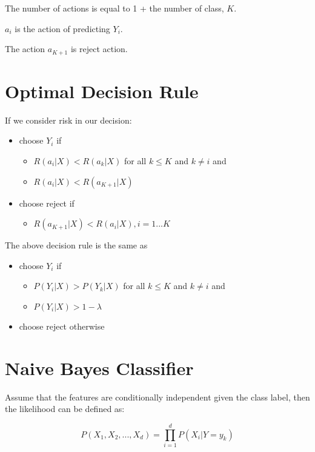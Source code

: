 \begin{multicols}{2}
\noindent The number of actions is equal to 1 + the number of class, $K$. 

\noindent $a_{i}$ is the action of predicting $Y_{i}$.

\noindent The action $a_{K+1}$ is reject action. 

\section{Optimal Decision Rule}

\noindent If we consider risk in our decision:

\begin{itemize}
    \item choose $Y_{i}$ if 
    \begin{itemize}
        \item $R(a_{i}|X) < R(a_{k}|X)$ for all $k \le K$ and $k \ne i$ and 
        \item $R(a_{i}|X) < R(a_{K+1}|X)$
    \end{itemize}
    \item choose reject if
    \begin{itemize}
        \item $R(a_{K+1}|X) < R(a_{i}|X), i=1...K$
    \end{itemize}
\end{itemize}

\noindent The above decision rule is the same as

\begin{itemize}
    \item choose $Y_{i}$ if 
    \begin{itemize}
        \item $P(Y_{i}|X) > P(Y_{k}|X)$ for all $k \le K$ and $k \ne i$ and 
        \item $P(Y_{i}|X) > 1 - \lambda$
    \end{itemize}
    \item choose reject otherwise
\end{itemize}

\section{Naive Bayes Classifier}

\noindent Assume that the features are conditionally independent given the class label, then the likelihood can be defined as:

$$P(X_1, X_2, ..., X_d) = \prod_{i=1}^{d} P(X_{i}|Y = y_{k})$$


\end{multicols}
